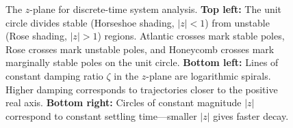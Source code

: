 \begin{figure}[htbp]

\caption{The $z$-plane for discrete-time system analysis. \textbf{Top left:} The unit circle divides stable (Horseshoe shading, $|z|<1$) from unstable (Rose shading, $|z|>1$) regions. Atlantic crosses mark stable poles, Rose crosses mark unstable poles, and Honeycomb crosses mark marginally stable poles on the unit circle. \textbf{Bottom left:} Lines of constant damping ratio $\zeta$ in the $z$-plane are logarithmic spirals. Higher damping corresponds to trajectories closer to the positive real axis. \textbf{Bottom right:} Circles of constant magnitude $|z|$ correspond to constant settling time---smaller $|z|$ gives faster decay.}
\label{fig:z_plane}
\end{figure}
